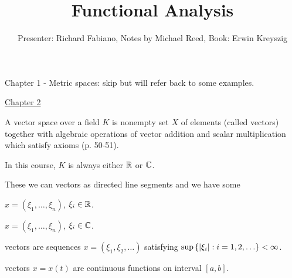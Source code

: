 \documentclass[]{article}
\author{Presenter: Richard Fabiano, Notes by Michael Reed, Book: Erwin Kreyszig}
\title{Functional Analysis}
\begin{document}
\maketitle


Chapter 1 - Metric spaces:
skip but will refer back to some examples.

\ul{Chapter 2}

\begin{definition}
	A vector space over a field $K$ is nonempty set $X$ of elements (called vectors) together with algebraic operations of vector addition and scalar multiplication which satisfy axioms (p. 50-51).
\end{definition}
\begin{note}
	In this course, $K$ is always either $\mathbb{R}$ or $\mathbb{C}$.
\end{note}
\begin{example}
	[$\mb R^2$ and $\mb R^3$] These we can  vectors as directed line segments and we have some 
\end{example}
\begin{example}
	[$X = \mb R^n$] $x = (\xi_1,\dots,\xi_n)$, $\xi_i\in\mathbb{R}$.
\end{example}
\begin{example}
	[$X=\mb C^n$] $x = (\xi_1,\dots,\xi_n)$, $\xi_i\in\mathbb{C}$.
\end{example}
\begin{example}
	[$X=\ell^\infty$] vectors are sequences $x=(\xi_1,\xi_2,\dots)$ satisfying $\sup\setc{|\xi_i|}{i=1,2,\dots}<\infty$.
\end{example}
\begin{example}
	[$X = C{[}a,b{]}$] vectors $x=x(t)$ are continuous functions on interval $[a,b]$.
\end{example}
\end{document}
